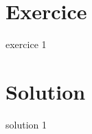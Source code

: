 \documentclass{article}
\begin{document}
\section{Exercice}

exercice 1

\section{Solution}

solution 1
\end{document}
